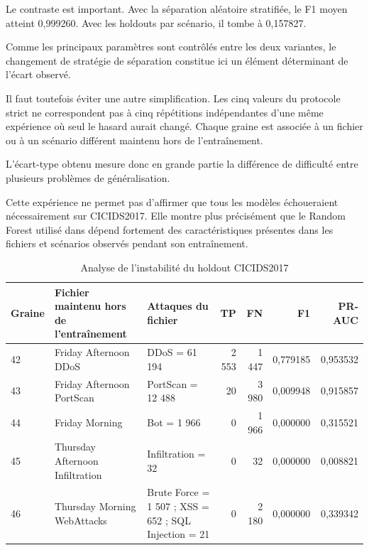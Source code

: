 Le contraste est important. Avec la séparation aléatoire stratifiée, le F1 moyen atteint 0,999260. Avec les holdouts par scénario, il tombe à 0,157827.

Comme les principaux paramètres sont contrôlés entre les deux variantes, le changement de stratégie de séparation constitue ici un élément déterminant de l'écart observé.

Il faut toutefois éviter une autre simplification. Les cinq valeurs du protocole strict ne correspondent pas à cinq répétitions indépendantes d'une même expérience où seul le hasard aurait changé. Chaque graine est associée à un fichier ou à un scénario différent maintenu hors de l'entraînement.

L'écart-type obtenu mesure donc en grande partie la différence de difficulté entre plusieurs problèmes de généralisation.

Cette expérience ne permet pas d'affirmer que tous les modèles échoueraient nécessairement sur CICIDS2017. Elle montre plus précisément que le Random Forest utilisé dans \logminer{} dépend fortement des caractéristiques présentes dans les fichiers et scénarios observés pendant son entraînement.

\begin{table}[H]
\centering
\caption{Analyse de l'instabilité du holdout CICIDS2017}
\label{tab:cicids-holdout-instability}
\scriptsize

\begin{tabularx}{\textwidth}{p{1cm}p{3.4cm}Xrrrr}
\toprule
\textbf{Graine} &
\textbf{Fichier maintenu hors de l'entraînement} &
\textbf{Attaques du fichier} &
\textbf{TP} &
\textbf{FN} &
\textbf{F1} &
\textbf{PR-AUC}
\tabularnewline
\midrule

42 &
Friday Afternoon DDoS &
DDoS = 61 194 &
2 553 &
1 447 &
0,779185 &
0,953532
\tabularnewline

43 &
Friday Afternoon PortScan &
PortScan = 12 488 &
20 &
3 980 &
0,009948 &
0,915857
\tabularnewline

44 &
Friday Morning &
Bot = 1 966 &
0 &
1 966 &
0,000000 &
0,315521
\tabularnewline

45 &
Thursday Afternoon Infiltration &
Infiltration = 32 &
0 &
32 &
0,000000 &
0,008821
\tabularnewline

46 &
Thursday Morning WebAttacks &
Brute Force = 1 507 ; XSS = 652 ; SQL Injection = 21 &
0 &
2 180 &
0,000000 &
0,339342
\tabularnewline

\bottomrule
\end{tabularx}
\end{table}

